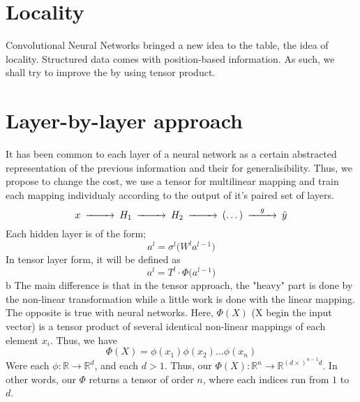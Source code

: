 \documentclass[11pt]{article}
\begin{document}
\section{Locality}
Convolutional Neural Networks bringed a new idea to the table, the idea of locality. Structured data comes with position-based information. 
As such, we shall try to improve the by using tensor product. 

\section{Layer-by-layer approach}
It has been common to each layer of a neural network as a certain abstracted representation of the previous information and their for generalisibility. Thus, we propose to change the cost, we use a tensor for multilinear mapping and train each mapping individualy according to the output of it's paired set of layers. 
\begin{equation*}
\begin{CD}
    x @>>>H_1 @>>>H_2 @>>>(\dots)@>g>> \hat{y}
\end{CD}
\end{equation*}
Each hidden layer is of the form;
\begin{equation*}
    a^l = \sigma^l \bigl( W^l a^{l-1} \bigr)
\end{equation*}
In tensor layer form, it will be defined as 
\begin{equation*}
    a^l = T^l \cdot \Phi \bigl( a^{l-1} \bigr)
\end{equation*}b
The main difference is that in the tensor approach, the "heavy" part is done by the non-linear transformation while a little work is done with the linear mapping. The opposite is true with neural networks. Here, $\Phi(X)$ (X begin the input vector) is a tensor product of several identical non-linear mappings of each element $x_i$. Thus, we have 
\begin{equation*}
    \Phi(X) = \phi(x_1)\phi(x_2)\dots\phi(x_n)
\end{equation*}
Were each $\phi : \mathbb{R} \rightarrow \mathbb{R}^d$, and each $d > 1$. Thus, our $\Phi(X) : \mathbb{R}^n \rightarrow \mathbb{R}^{ (d \times)^{n-1}d} $. In other words, our $\Phi$ returns a tensor of order $n$, where each indices run from $1$ to $d$.





\end{document}
